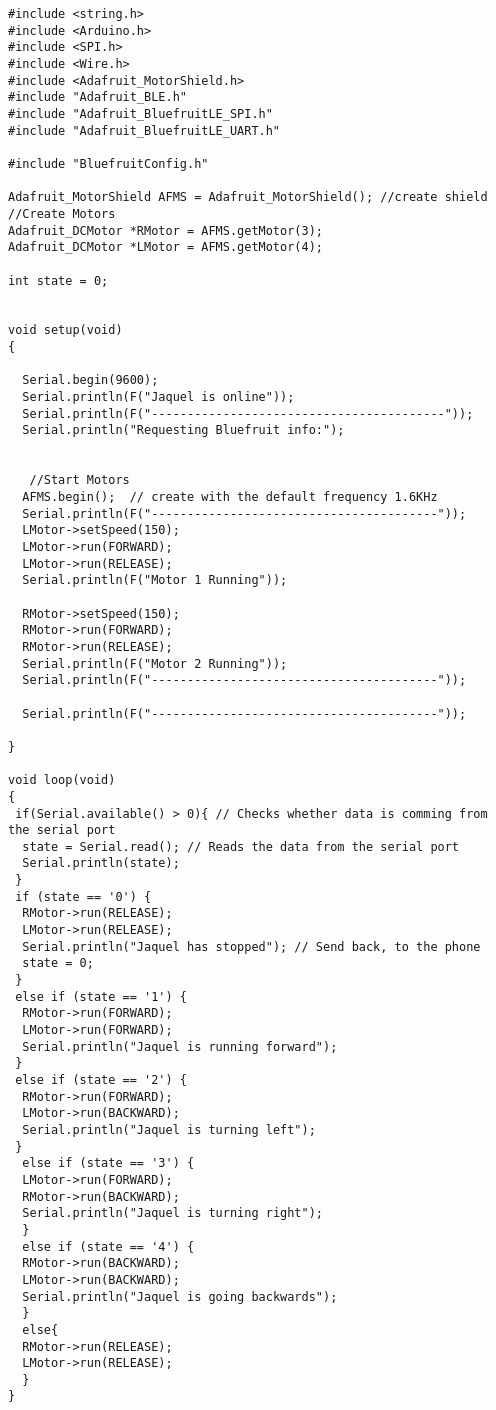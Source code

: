 \documentclass[10pt,letterpaper]{article}
\author{Brock Ellefson}
\begin{document}
\begin{lstlisting}
#include <string.h>
#include <Arduino.h>
#include <SPI.h>
#include <Wire.h>
#include <Adafruit_MotorShield.h>
#include "Adafruit_BLE.h"
#include "Adafruit_BluefruitLE_SPI.h"
#include "Adafruit_BluefruitLE_UART.h"

#include "BluefruitConfig.h"

Adafruit_MotorShield AFMS = Adafruit_MotorShield(); //create shield
//Create Motors
Adafruit_DCMotor *RMotor = AFMS.getMotor(3);
Adafruit_DCMotor *LMotor = AFMS.getMotor(4);

int state = 0;


void setup(void)
{

  Serial.begin(9600);
  Serial.println(F("Jaquel is online"));
  Serial.println(F("-----------------------------------------"));
  Serial.println("Requesting Bluefruit info:");

  
   //Start Motors
  AFMS.begin();  // create with the default frequency 1.6KHz
  Serial.println(F("----------------------------------------"));
  LMotor->setSpeed(150);
  LMotor->run(FORWARD);
  LMotor->run(RELEASE);
  Serial.println(F("Motor 1 Running"));

  RMotor->setSpeed(150);
  RMotor->run(FORWARD);
  RMotor->run(RELEASE);
  Serial.println(F("Motor 2 Running"));
  Serial.println(F("----------------------------------------"));

  Serial.println(F("----------------------------------------"));

}

void loop(void)
{
 if(Serial.available() > 0){ // Checks whether data is comming from the serial port
  state = Serial.read(); // Reads the data from the serial port
  Serial.println(state);
 }
 if (state == '0') {
  RMotor->run(RELEASE);
  LMotor->run(RELEASE);
  Serial.println("Jaquel has stopped"); // Send back, to the phone
  state = 0;
 }
 else if (state == '1') {
  RMotor->run(FORWARD);
  LMotor->run(FORWARD);
  Serial.println("Jaquel is running forward");
 } 
 else if (state == '2') {
  RMotor->run(FORWARD);
  LMotor->run(BACKWARD);
  Serial.println("Jaquel is turning left");
 }
  else if (state == '3') {
  LMotor->run(FORWARD);
  RMotor->run(BACKWARD);
  Serial.println("Jaquel is turning right");
  }
  else if (state == '4') {
  RMotor->run(BACKWARD);
  LMotor->run(BACKWARD);
  Serial.println("Jaquel is going backwards");
  }
  else{
  RMotor->run(RELEASE);
  LMotor->run(RELEASE);  
  }
}
\end{lstlisting}
\end{document}
